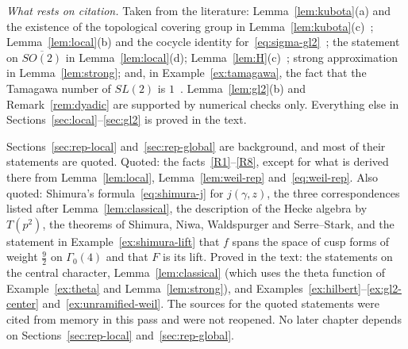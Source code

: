 \begin{remarkrev}\label{rem:sec2-status}
\emph{What rests on citation.} Taken from the literature:
Lemma~\ref{lem:kubota}(a) and the existence of the topological covering
group in Lemma~\ref{lem:kubota}(c)~\cite{Ku67,Mo68}; Lemma~\ref{lem:local}(b)
and the cocycle identity for~\eqref{eq:sigma-gl2}~\cite{Ku69,Ge76}; the
statement on $\overline{SO(2)}$ in Lemma~\ref{lem:local}(d);
Lemma~\ref{lem:H}(c)~\cite{Ar78}; strong approximation in
Lemma~\ref{lem:strong}; and, in Example~\ref{ex:tamagawa}, the fact that
the Tamagawa number of $SL(2)$ is $1$~\cite{We82}. Lemma~\ref{lem:gl2}(b) and
Remark~\ref{rem:dyadic} are supported by numerical checks only.
Everything else in
Sections~\ref{sec:local}--\ref{sec:gl2} is proved in the text.

Sections~\ref{sec:rep-local} and~\ref{sec:rep-global} are background, and
most of their statements are quoted. Quoted: the
facts~\ref{R1}--\ref{R8}, except for what is derived there from
Lemma~\ref{lem:local}, Lemma~\ref{lem:weil-rep} and~\eqref{eq:weil-rep}.
Also quoted: Shimura's formula~\eqref{eq:shimura-j} for $j(\gamma,z)$,
the three correspondences listed after Lemma~\ref{lem:classical},
the description of the Hecke algebra by $T(p^2)$, the theorems of
Shimura, Niwa, Waldspurger and Serre--Stark, and the statement
in Example~\ref{ex:shimura-lift} that $f$ spans the space of cusp forms of
weight $\frac92$ on $\Gamma_0(4)$ and that $F$ is its lift. Proved in
the text: the statements on the central character, Lemma~\ref{lem:classical}
(which uses the theta function of Example~\ref{ex:theta} and
Lemma~\ref{lem:strong}), and Examples~\ref{ex:hilbert}--\ref{ex:gl2-center}
and~\ref{ex:unramified-weil}. The sources for the quoted statements were
cited from memory in this pass and were not reopened. No later chapter
depends on Sections~\ref{sec:rep-local} and~\ref{sec:rep-global}.
\end{remarkrev}

